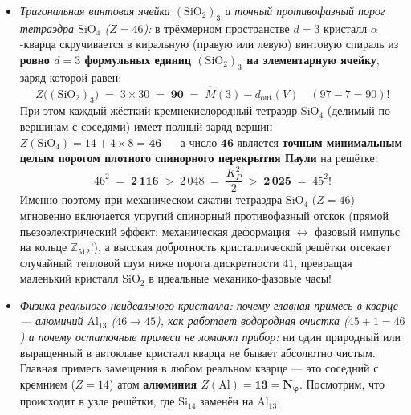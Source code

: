 \begin{enumerate}[label=\textbf{\arabic*.},leftmargin=*]
\begin{itemize}[noitemsep]
    Атом кремния несёт заряд $Z(\mathrm{Si}) = \mathbf{14 = N_\varphi + 1}$ ($13+1$), а пара атомов кислорода --- $Z(\mathrm{O}_2) = 2\times 8 = \mathbf{16 = 2|{\triangle}(3)|}$. Их сумма даёт молекулу кремнезёма:
    \[
      Z(\mathrm{SiO_2}) \;=\; 14 + 16 \;=\; \mathbf{30} \;=\; |\square(3)|\cdot d_{\mathrm{out}}(E) \quad (6\times 5 = 30),
    \]
    а двухканальная клетка $(\mu_0,\mu_1) = (14,16)$ лежит глубоко внутри устойчивого четверть-круга ($14^2 + 16^2 = 196 + 256 = \mathbf{452 \le 4\,096 = K_P^2}$) с собственной равновесной фазой $\varphi_{\mathrm{SiO_2}} = (30\times 41)\bmod 512 = \mathbf{206 = 316_8}$;
  \item \emph{Тригональная винтовая ячейка $(\mathrm{SiO_2})_3$ и точный противофазный порог тетраэдра $\mathrm{SiO_4}$ ($Z = 46$):}
    в трёхмерном пространстве $d = 3$ кристалл $\alpha$-кварца скручивается в киральную (правую или левую) винтовую спираль из \textbf{ровно $d = 3$ формульных единиц $(\mathrm{SiO_2})_3$ на элементарную ячейку}, заряд которой равен:
    \[
      Z\bigl((\mathrm{SiO_2})_3\bigr) \;=\; 3\times 30 \;=\; \mathbf{90} \;=\; \hat{M}(3) - d_{\mathrm{out}}(V) \quad (97 - 7 = 90)!
    \]
    При этом каждый жёсткий кремнекислородный тетраэдр $\mathrm{SiO_4}$ (делимый по вершинам с соседями) имеет полный заряд вершин $Z(\mathrm{SiO_4}) = 14 + 4\times 8 = \mathbf{46}$ --- а число $\mathbf{46}$ является \textbf{точным минимальным целым порогом плотного спинорного перекрытия Паули} на решётке:
    \[
      46^2 \;=\; \mathbf{2\,116} \;>\; 2\,048 \;=\; \frac{K_P^2}{2} \;>\; \mathbf{2\,025} \;=\; 45^2!
    \]
    Именно поэтому при механическом сжатии тетраэдра $\mathrm{SiO_4}$ ($Z = 46$) мгновенно включается упругий спинорный противофазный отскок (прямой пьезоэлектрический эффект: механическая деформация $\leftrightarrow$ фазовый импульс на кольце $\mathbb{Z}_{512}$!), а высокая добротность кристаллической решётки отсекает случайный тепловой шум ниже порога дискретности $41$, превращая маленький кристалл $\mathrm{SiO_2}$ в идеальные механико-фазовые часы!
  \item \emph{Физика реального неидеального кристалла: почему главная примесь в кварце --- алюминий $\mathrm{Al}_{13}$ ($46\to 45$), как работает водородная очистка ($45+1=46$) и почему остаточные примеси не ломают прибор:}
    ни один природный или выращенный в автоклаве кристалл кварца не бывает абсолютно чистым. Главная примесь замещения в любом реальном кварце --- это соседний с кремнием ($Z=14$) атом \textbf{алюминия $Z(\mathrm{Al}) = \mathbf{13 = N_\varphi}$}. Посмотрим, что происходит в узле решётки, где $\mathrm{Si}_{14}$ заменён на $\mathrm{Al}_{13}$:

\end{itemize}
\end{enumerate}
